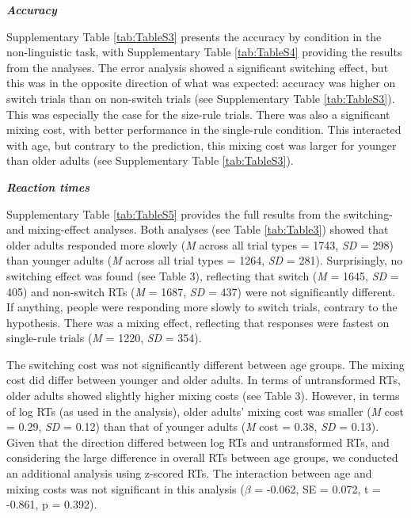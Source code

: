\documentclass[
]{article}
\begin{document}
\hfill\break

\textbf{\emph{Accuracy}}

Supplementary Table \ref{tab:TableS3} presents the accuracy by condition in the non-linguistic task, with Supplementary Table \ref{tab:TableS4} providing the results from the analyses. The error analysis showed a significant switching effect, but this was in the opposite direction of what was expected: accuracy was higher on switch trials than on non-switch trials (see Supplementary Table \ref{tab:TableS3}). This was especially the case for the size-rule trials. There was also a significant mixing cost, with better performance in the single-rule condition. This interacted with age, but contrary to the prediction, this mixing cost was larger for younger than older adults (see Supplementary Table \ref{tab:TableS3}).

\textbf{\emph{Reaction times}}

Supplementary Table \ref{tab:TableS5} provides the full results from the switching- and mixing-effect analyses. Both analyses (see Table \ref{tab:Table3}) showed that older adults responded more slowly (\emph{M} across all trial types = 1743, \emph{SD} = 298) than younger adults (\emph{M} across all trial types = 1264, \emph{SD} = 281). Surprisingly, no switching effect was found (see Table 3), reflecting that switch (\emph{M} = 1645, \emph{SD} = 405) and non-switch RTs (\emph{M} = 1687, \emph{SD} = 437) were not significantly different. If anything, people were responding more slowly to switch trials, contrary to the hypothesis. There was a mixing effect, reflecting that responses were fastest on single-rule trials (\emph{M} = 1220, \emph{SD} = 354).

The switching cost was not significantly different between age groups. The mixing cost did differ between younger and older adults. In terms of untransformed RTs, older adults showed slightly higher mixing costs (see Table 3). However, in terms of log RTs (as used in the analysis), older adults' mixing cost was smaller (\emph{M} cost = 0.29, \emph{SD} = 0.12) than that of younger adults (\emph{M} cost = 0.38, \emph{SD} = 0.13). Given that the direction differed between log RTs and untransformed RTs, and considering the large difference in overall RTs between age groups, we conducted an additional analysis using z-scored RTs. The interaction between age and mixing costs was not significant in this analysis (\(\beta\) = -0.062, SE = 0.072, t = -0.861, p = 0.392).
\end{document}
